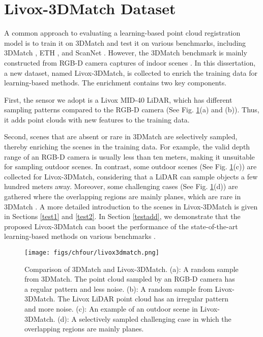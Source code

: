 \section{Livox-3DMatch Dataset} \label{dataset}
A common approach \cite{sghr,pre} to evaluating a learning-based point cloud registration model is to train it on 3DMatch \cite{3dmatch} and test it on various benchmarks, including 3DMatch \cite{3dmatch}, ETH \cite{eth}, and ScanNet \cite{scan}. However, the 3DMatch benchmark is mainly constructed from RGB-D camera captures of indoor scenes \cite{3dmatch}. In this dissertation, a new dataset, named Livox-3DMatch, is collected to enrich the training data for learning-based methods. The enrichment contains two key components. 
\par
First, the sensor we adopt is a Livox MID-40 LiDAR, which has different sampling patterns compared to the RGB-D camera (See Fig. \ref{livox3d}(a) and (b)). Thus, it adds point clouds with new features to the training data. 
\par
Second, scenes that are absent or rare in 3DMatch are selectively sampled, thereby enriching the scenes in the training data. For example, the valid depth range of an RGB-D camera is usually less than ten meters, making it unsuitable for sampling outdoor scenes. In contrast, some outdoor scenes (See Fig. \ref{livox3d}(c)) are collected for Livox-3DMatch, considering that a LiDAR can sample objects a few hundred meters away. Moreover, some challenging cases (See Fig. \ref{livox3d}(d)) are gathered where the overlapping regions are mainly planes, which are rare in 3DMatch \cite{3dmatch}. A more detailed introduction to the scenes in Livox-3DMatch is given in Sections \ref{test1} and \ref{test2}. In Section \ref{testadd}, we demonstrate that the proposed Livox-3DMatch can boost the performance of the state-of-the-art learning-based methods \cite{mdgd,sghr} on various benchmarks \cite{3dmatch,eth,scan}.
\begin{figure}[H] 
	\centering
\texttt{[image: figs/chfour/livox3dmatch.png]}
	\caption{Comparison of 3DMatch and Livox-3DMatch. (a): A random sample from 3DMatch. The point cloud sampled by an RGB-D camera has a regular pattern and less noise. (b): A random sample from Livox-3DMatch. The Livox LiDAR point cloud has an irregular pattern and more noise. (c): An example of an outdoor scene in Livox-3DMatch. (d): A selectively sampled challenging case in which the overlapping regions are mainly planes.}
	\label{livox3d}
\end{figure}

